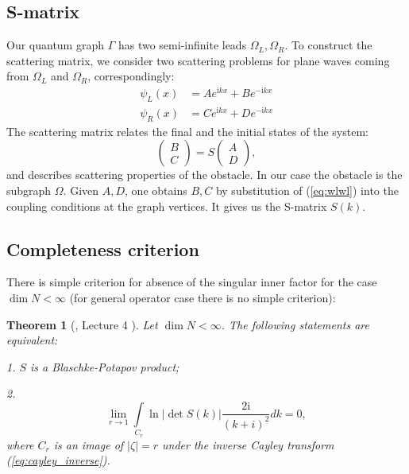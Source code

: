 \documentclass{birkjour}
\newtheorem{thm}{Theorem}[section]
\theoremstyle{definition}
\theoremstyle{remark}
\numberwithin{equation}{section}
\begin{document}
\subsection{S-matrix}\label{sec:smatrix}
Our quantum graph $\Gamma$ has two semi-infinite leads
$\Omega_L,\Omega_R$. To construct the scattering matrix, we
consider two scattering problems for plane waves coming from
$\Omega_L$ and $\Omega_R$, correspondingly:
\begin{equation}\label{eq:wlwl}
\begin{aligned}
   \psi_L(x) &= A e^{\mathrm{i} k x} + B e^{-\mathrm{i} k x}
\\ \psi_R(x) &= C e^{\mathrm{i} k x} + D e^{-\mathrm{i} k x}
\end{aligned}
\end{equation}
The scattering matrix relates the final and the initial states of
the system:
\begin{equation}\label{eq:smatrix}
\begin{pmatrix} B \\ C \end{pmatrix} = S \begin{pmatrix} A \\
D \end{pmatrix},
\end{equation}
and describes scattering properties of the obstacle. In our case
the obstacle is the subgraph $\Omega$. Given $A,D$, one obtains
$B,C$ by substitution of (\ref{eq:wlwl}) into the coupling
conditions at the graph vertices. It
gives us the S-matrix $S(k)$.

\subsection{Completeness criterion}
There is simple criterion for absence of the singular inner factor
for the case  $\dim  N < \infty$ (for general operator case there
is no simple criterion):

\begin{thm}[\cite{Nik}, Lecture 4 ] Let $\dim  N < \infty$. The following
statements are equivalent:

1.  $S$ is a Blaschke-Potapov  product;

2. \begin{equation}\label{eq:crit} \lim\limits_{r \to 1}
\int\limits_{C_r} \ln \left|\det S(k)\right| \frac{2
\mathrm{i}}{(k + i)^2} dk = 0,
\end{equation}
where $C_r$ is an image of $\left|\zeta\right| = r$ under the
inverse Cayley transform (\ref{eq:cayley_inverse}).
\end{thm}
\end{document}
